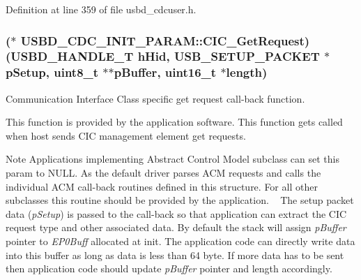 Definition at line 359 of file usbd\+\_\+cdcuser.\+h.

\subsubsection[{\texorpdfstring{C\+I\+C\+\_\+\+Get\+Request}{CIC_GetRequest}}]{($\ast$ U\+S\+B\+D\+\_\+\+C\+D\+C\+\_\+\+I\+N\+I\+T\+\_\+\+P\+A\+R\+A\+M\+::\+C\+I\+C\+\_\+\+Get\+Request) ({\bf U\+S\+B\+D\+\_\+\+H\+A\+N\+D\+L\+E\+\_\+T} h\+Hid, {\bf U\+S\+B\+\_\+\+S\+E\+T\+U\+P\+\_\+\+P\+A\+C\+K\+ET} $\ast$p\+Setup, uint8\+\_\+t $\ast$$\ast$p\+Buffer, uint16\+\_\+t $\ast$length)}\hypertarget{structUSBD__CDC__INIT__PARAM_a7393ec7442baaa058bed1384a9fc6fa6}{}\label{structUSBD__CDC__INIT__PARAM_a7393ec7442baaa058bed1384a9fc6fa6}
Communication Interface Class specific get request call-\/back function.

This function is provided by the application software. This function gets called when host sends C\+IC management element get requests. \begin{DoxyNote}{Note}
Applications implementing Abstract Control Model subclass can set this param to N\+U\+LL. As the default driver parses A\+CM requests and calls the individual A\+CM call-\/back routines defined in this structure. For all other subclasses this routine should be provided by the application. ~\newline
The setup packet data ({\itshape p\+Setup}) is passed to the call-\/back so that application can extract the C\+IC request type and other associated data. By default the stack will assign {\itshape p\+Buffer} pointer to {\itshape E\+P0\+Buff} allocated at init. The application code can directly write data into this buffer as long as data is less than 64 byte. If more data has to be sent then application code should update {\itshape p\+Buffer} pointer and length accordingly.
\end{DoxyNote}

